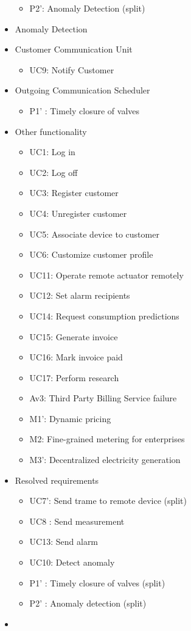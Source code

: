 \begin{itemize}
\begin{itemize}
	  	\item P2': Anomaly Detection (split)
	\end{itemize}
	\item Anomaly Detection
	\item Customer Communication Unit
	\begin{itemize}
		\item UC9: Notify Customer
	\end{itemize}
	\item Outgoing Communication Scheduler
	\begin{itemize}
	  \item P1' : Timely closure of valves
	\end{itemize}
	\item Other functionality
	\begin{itemize}
	  	\item UC1: Log in
	  	\item UC2: Log off
	  	\item UC3: Register customer
	  	\item UC4: Unregister customer
	  	\item UC5: Associate device to customer
	  	\item UC6: Customize customer profile
	  	\item UC11: Operate remote actuator remotely
	  	\item UC12: Set alarm recipients
	  	\item UC14: Request consumption predictions
	  	\item UC15: Generate invoice
	  	\item UC16: Mark invoice paid
	  	\item UC17: Perform research
	  	\item Av3: Third Party Billing Service failure
	  	\item M1': Dynamic pricing
	  	\item M2: Fine-grained metering for enterprises
	  	\item M3': Decentralized electricity generation
	\end{itemize}
	\item Resolved requirements
	\begin{itemize}
		\item UC7': Send trame to remote device (split)
		\item UC8 : Send measurement
		\item UC13: Send alarm
		\item UC10: Detect anomaly
		\item P1' : Timely closure of valves (split)
		\item P2' : Anomaly detection (split)
	\end{itemize}
	\item 
\end{itemize}

